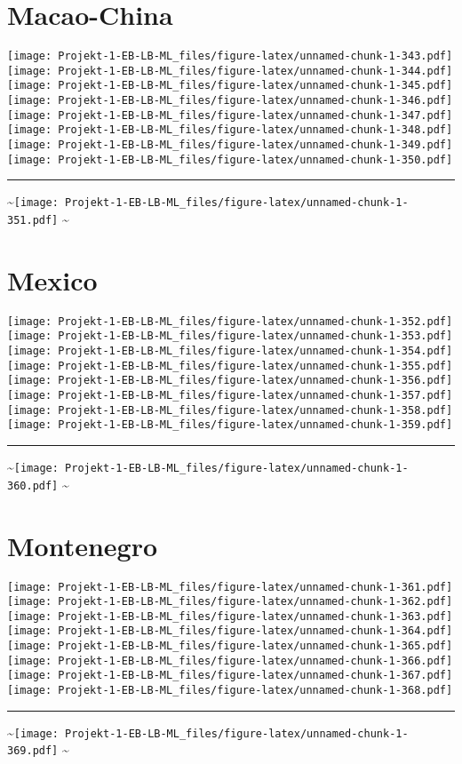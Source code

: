 \documentclass[]{article}
\begin{document}
\section{Macao-China}\label{macao-china}

\texttt{[image: Projekt-1-EB-LB-ML\_files/figure-latex/unnamed-chunk-1-343.pdf]}
\texttt{[image: Projekt-1-EB-LB-ML\_files/figure-latex/unnamed-chunk-1-344.pdf]}
\texttt{[image: Projekt-1-EB-LB-ML\_files/figure-latex/unnamed-chunk-1-345.pdf]}
\texttt{[image: Projekt-1-EB-LB-ML\_files/figure-latex/unnamed-chunk-1-346.pdf]}
\texttt{[image: Projekt-1-EB-LB-ML\_files/figure-latex/unnamed-chunk-1-347.pdf]}
\texttt{[image: Projekt-1-EB-LB-ML\_files/figure-latex/unnamed-chunk-1-348.pdf]}
\texttt{[image: Projekt-1-EB-LB-ML\_files/figure-latex/unnamed-chunk-1-349.pdf]}
\texttt{[image: Projekt-1-EB-LB-ML\_files/figure-latex/unnamed-chunk-1-350.pdf]}
\bigskip\hrule\bigskip
\textasciitilde{}\hfill\texttt{[image: Projekt-1-EB-LB-ML\_files/figure-latex/unnamed-chunk-1-351.pdf]}
\hfill \textasciitilde{} \vfill\eject

\section{Mexico}\label{mexico}

\texttt{[image: Projekt-1-EB-LB-ML\_files/figure-latex/unnamed-chunk-1-352.pdf]}
\texttt{[image: Projekt-1-EB-LB-ML\_files/figure-latex/unnamed-chunk-1-353.pdf]}
\texttt{[image: Projekt-1-EB-LB-ML\_files/figure-latex/unnamed-chunk-1-354.pdf]}
\texttt{[image: Projekt-1-EB-LB-ML\_files/figure-latex/unnamed-chunk-1-355.pdf]}
\texttt{[image: Projekt-1-EB-LB-ML\_files/figure-latex/unnamed-chunk-1-356.pdf]}
\texttt{[image: Projekt-1-EB-LB-ML\_files/figure-latex/unnamed-chunk-1-357.pdf]}
\texttt{[image: Projekt-1-EB-LB-ML\_files/figure-latex/unnamed-chunk-1-358.pdf]}
\texttt{[image: Projekt-1-EB-LB-ML\_files/figure-latex/unnamed-chunk-1-359.pdf]}
\bigskip\hrule\bigskip
\textasciitilde{}\hfill\texttt{[image: Projekt-1-EB-LB-ML\_files/figure-latex/unnamed-chunk-1-360.pdf]}
\hfill \textasciitilde{} \vfill\eject

\section{Montenegro}\label{montenegro}

\texttt{[image: Projekt-1-EB-LB-ML\_files/figure-latex/unnamed-chunk-1-361.pdf]}
\texttt{[image: Projekt-1-EB-LB-ML\_files/figure-latex/unnamed-chunk-1-362.pdf]}
\texttt{[image: Projekt-1-EB-LB-ML\_files/figure-latex/unnamed-chunk-1-363.pdf]}
\texttt{[image: Projekt-1-EB-LB-ML\_files/figure-latex/unnamed-chunk-1-364.pdf]}
\texttt{[image: Projekt-1-EB-LB-ML\_files/figure-latex/unnamed-chunk-1-365.pdf]}
\texttt{[image: Projekt-1-EB-LB-ML\_files/figure-latex/unnamed-chunk-1-366.pdf]}
\texttt{[image: Projekt-1-EB-LB-ML\_files/figure-latex/unnamed-chunk-1-367.pdf]}
\texttt{[image: Projekt-1-EB-LB-ML\_files/figure-latex/unnamed-chunk-1-368.pdf]}
\bigskip\hrule\bigskip
\textasciitilde{}\hfill\texttt{[image: Projekt-1-EB-LB-ML\_files/figure-latex/unnamed-chunk-1-369.pdf]}
\hfill \textasciitilde{} \vfill\eject
\end{document}
